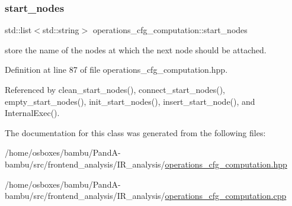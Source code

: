 \subsubsection{\texorpdfstring{start\+\_\+nodes}{start\_nodes}}
{\footnotesize\ttfamily std\+::list$<$std\+::string$>$ operations\+\_\+cfg\+\_\+computation\+::start\+\_\+nodes\hspace{0.3cm}{\ttfamily [private]}}



store the name of the nodes at which the next node should be attached. 



Definition at line 87 of file operations\+\_\+cfg\+\_\+computation.\+hpp.



Referenced by clean\+\_\+start\+\_\+nodes(), connect\+\_\+start\+\_\+nodes(), empty\+\_\+start\+\_\+nodes(), init\+\_\+start\+\_\+nodes(), insert\+\_\+start\+\_\+node(), and Internal\+Exec().



The documentation for this class was generated from the following files\+:\begin{DoxyCompactItemize}
\item 
/home/osboxes/bambu/\+Pand\+A-\/bambu/src/frontend\+\_\+analysis/\+I\+R\+\_\+analysis/\hyperlink{operations__cfg__computation_8hpp}{operations\+\_\+cfg\+\_\+computation.\+hpp}\item 
/home/osboxes/bambu/\+Pand\+A-\/bambu/src/frontend\+\_\+analysis/\+I\+R\+\_\+analysis/\hyperlink{operations__cfg__computation_8cpp}{operations\+\_\+cfg\+\_\+computation.\+cpp}\end{DoxyCompactItemize}
